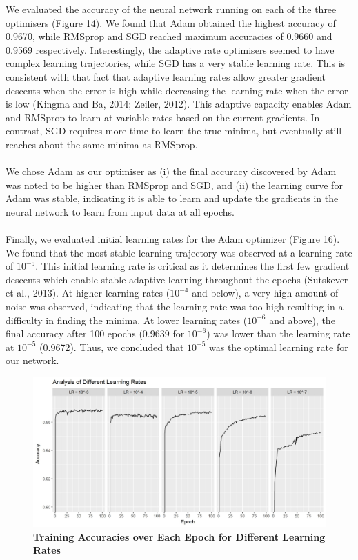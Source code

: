 \documentclass{article}
\begin{document}
We evaluated the accuracy of the neural network running on each of the three optimisers (Figure 14). We found that Adam obtained the highest accuracy of 0.9670, while RMSprop and SGD reached maximum accuracies of 0.9660 and 0.9569 respectively. Interestingly, the adaptive rate optimisers seemed to have complex learning trajectories, while SGD has a very stable learning rate. This is consistent with that fact that adaptive learning rates allow greater gradient descents when the error is high while decreasing the learning rate when the error is low (Kingma and Ba, 2014; Zeiler, 2012). This adaptive capacity enables Adam and RMSprop to learn at variable rates based on the current gradients. In contrast, SGD requires more time to learn the true minima, but eventually still reaches about the same minima as RMSprop.\\\\
We chose Adam as our optimiser as (i) the final accuracy discovered by Adam was noted to be higher than RMSprop and SGD, and (ii) the  learning curve for Adam was stable, indicating it is able to learn and update the gradients in the neural network to learn from input data at all epochs.\\\\
Finally, we evaluated initial learning rates for the Adam optimizer (Figure 16). We found that the most stable learning trajectory was observed at a learning rate of $10^{-5}$. This initial learning rate is critical as it determines the first few gradient descents which enable stable adaptive learning throughout the epochs (Sutskever et al., 2013). At higher learning rates ($10^{-4}$ and below), a very high amount of noise was observed, indicating that the learning rate was too high resulting in a difficulty in finding the minima. At lower learning rates ($10^{-6}$ and above), the final accuracy after 100 epochs (0.9639 for $10^{-6}$) was lower than the learning rate at $10^{-5}$ (0.9672). Thus, we concluded that $10^{-5}$ was the optimal learning rate for our network.
\begin{figure}[H]
\includegraphics[width=\textwidth]{learningrates.jpg}
\centering
\caption{\textbf{Training Accuracies over Each Epoch for Different Learning Rates}}
\end{figure}
\end{document}

